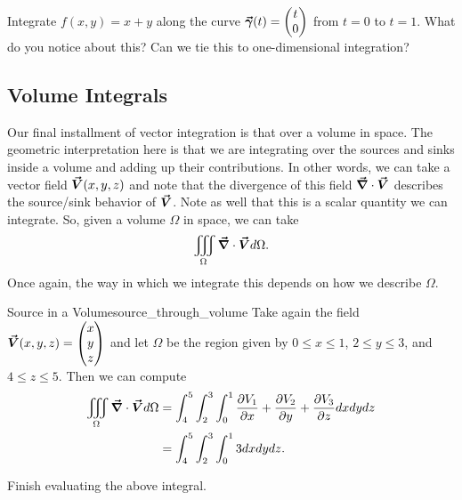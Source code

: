                        \begin{exercise}
                       Integrate $f(x,y)=x+y$ along the curve $\boldsymbol{\vec{\gamma}}(t)=\begin{pmatrix} t \\ 0 \end{pmatrix}$ from $t=0$ to $t=1$. What do you notice about this? Can we tie this to one-dimensional integration?
                       \end{exercise}

        \subsection{Volume Integrals}

         Our final installment of vector integration is that over a volume in space.  The geometric interpretation here is that we are integrating over the sources and sinks inside a volume and adding up their contributions.  In other words, we can take a vector field $\boldsymbol{\vec{V}}(x,y,z)$ and note that the divergence of this field $\boldsymbol{\vec{\nabla}} \cdot \boldsymbol{\vec{V}}$ describes the source/sink behavior of $\boldsymbol{\vec{V}}$.  Note as well that this is a scalar quantity we can integrate.  So, given a volume $\Omega$ in space, we can take
         \[
         \iiint_\Omega \boldsymbol{\vec{\nabla}} \cdot \boldsymbol{\vec{V}} d\Omega.
         \]
         Once again, the way in which we integrate this depends on how we describe $\Omega$.

         \begin{ex}{Source in a Volume}{source_through_volume}
         	Take again the field $\boldsymbol{\vec{V}}(x,y,z) = \begin{pmatrix} x \\ y \\ z \end{pmatrix}$ and let $\Omega$ be the region given by $0\leq x \leq 1$, $2\leq y \leq 3$, and $4\leq z \leq 5$.  Then we can compute
         	\begin{align*}
         		\iiint_\Omega \boldsymbol{\vec{\nabla}} \cdot \boldsymbol{\vec{V}} d\Omega &= \int_4^5 \int_2^3 \int_0^1 \frac{\partial V_1}{\partial x}+\frac{\partial V_2}{\partial y} + \frac{\partial V_3}{\partial z} dxdydz\\
         		&= \int_4^5 \int_2^3 \int_0^1 3 dxdydz.
         	\end{align*}
         \end{ex}

         \begin{exercise}
         	Finish evaluating the above integral.
         \end{exercise}

